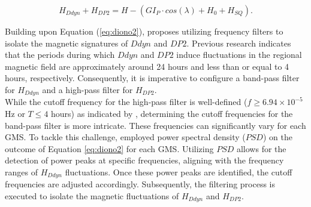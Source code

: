\documentclass[12pt]{article}
\begin{document}
\begin{equation}
	\label{eq:diono2}
	H_{Ddyn}+H_{DP2} = H-(GI_P \cdot cos(\lambda)+H_0+H_{SQ}).
\end{equation}

Building upon Equation (\ref{eq:diono2}), \cite{amory2020_filtros} proposes utilizing frequency filters to isolate the magnetic signatures of $Ddyn$ and $DP2$. Previous research \citep{nishida_68_fluctuations, blanc_ddyn} indicates that the periods during which $Ddyn$ and $DP2$ induce fluctuations in the regional magnetic field are approximately around 24 hours and less than or equal to 4 hours, respectively. Consequently, it is imperative to configure a band-pass filter for $H_{Ddyn}$ and a high-pass filter for $H_{DP2}$.\\

While the cutoff frequency for the high-pass filter is well-defined ($f \geq 6.94 \times 10^{-5}$ Hz or $T \leq 4$ hours) as indicated by \cite{nishida_68_fluctuations}, determining the cutoff frequencies for the band-pass filter is more intricate. These frequencies can significantly vary for each GMS. To tackle this challenge, \cite{CASTELLANOSVELAZCO2024106237} employed power spectral density ($PSD$) on the outcome of Equation \ref{eq:diono2} for each GMS. Utilizing $PSD$ allows for the detection of power peaks at specific frequencies, aligning with the frequency ranges of $H_{Ddyn}$ fluctuations. Once these power peaks are identified, the cutoff frequencies are adjusted accordingly. Subsequently, the filtering process is executed to isolate the magnetic fluctuations of $H_{Ddyn}$ and $H_{DP2}$.\\
\end{document}
